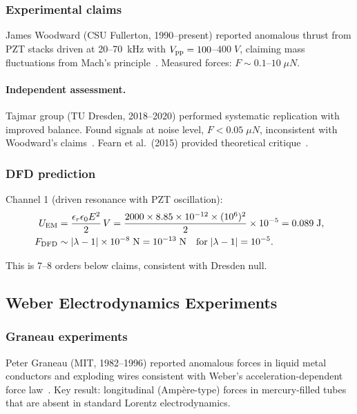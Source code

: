 \documentclass[aps,prd,twocolumn,superscriptaddress,floatfix,nofootinbib]{revtex4-2}
\newcommand{\lam}{\lambda}
\begin{document}
\subsubsection{Experimental claims}

James Woodward (CSU Fullerton, 1990--present) reported anomalous thrust
from PZT stacks driven at 20--70~kHz with $V_{\rm pp} = 100$--$400\;\si{V}$,
claiming mass fluctuations from Mach's principle~\cite{Woodward2004,
Woodward2013}. Measured forces: $F \sim 0.1$--$10\;\si{\mu N}$.

\paragraph{Independent assessment.}
Tajmar group (TU Dresden, 2018--2020) performed systematic replication
with improved balance. Found signals at noise level, $F < 0.05\;\si{\mu N}$,
inconsistent with Woodward's claims~\cite{Kockel2018}.
Fearn et al.\ (2015) provided theoretical critique~\cite{Fearn2015}.

\subsubsection{DFD prediction}

Channel 1 (driven resonance with PZT oscillation):
\begin{align}
U_{\rm EM} &= \frac{\epsilon_r\epsilon_0 E^2}{2}\,V
= \frac{2000 \times 8.85\times10^{-12} \times (10^6)^2}{2}
\times 10^{-5} = 0.089\;\si{J}, \\
F_{\rm DFD} &\sim |\lam-1| \times 10^{-8}\;\si{N}
= 10^{-13}\;\si{N}\quad\text{for}\;|\lam-1| = 10^{-5}.
\end{align}

This is 7--8 orders below claims, consistent with Dresden null.

\subsection{Weber Electrodynamics Experiments}\label{sec:weber}

\subsubsection{Graneau experiments}

Peter Graneau (MIT, 1982--1996) reported anomalous forces in liquid
metal conductors and exploding wires consistent with Weber's
acceleration-dependent force law~\cite{Graneau1985,Graneau1996}. Key
result: longitudinal (Amp\`ere-type) forces in mercury-filled tubes
that are absent in standard Lorentz electrodynamics.
\end{document}
